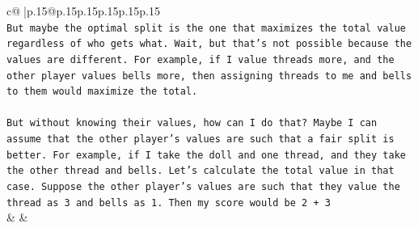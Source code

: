 \documentclass{article}
\begin{document}
{\begin{supertabular}{c@{$\;$}|p{.15\linewidth}@{}p{.15\linewidth}p{.15\linewidth}p{.15\linewidth}p{.15\linewidth}p{.15\linewidth}}
{{{\\ 
\texttt{But maybe the optimal split is the one that maximizes the total value regardless of who gets what. Wait, but that's not possible because the values are different. For example, if I value threads more, and the other player values bells more, then assigning threads to me and bells to them would maximize the total.} \\
\\ 
\texttt{But without knowing their values, how can I do that? Maybe I can assume that the other player's values are such that a fair split is better. For example, if I take the doll and one thread, and they take the other thread and bells. Let's calculate the total value in that case. Suppose the other player's values are such that they value the thread as 3 and bells as 1. Then my score would be 2 + 3} \\
            }
        }
    }
    & & \\ \\


\end{supertabular}}
\end{document}
